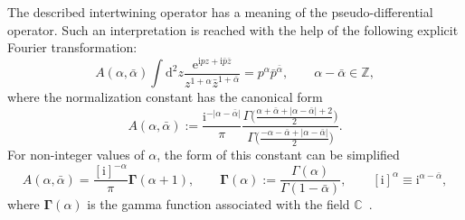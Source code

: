 \documentclass[pdftex]{sigma}
\renewcommand{\imath}{\mathrm{i}}
\numberwithin{equation}{section}
\begin{document}
The described intertwining operator has a meaning of the
pseudo-differential operator. Such an interpretation is reached
with the help of the following explicit Fourier transformation:
\begin{equation}\label{F}
A(\alpha,\bar\alpha) \int \mathrm{d}^2 z \frac{\mathrm{e}^{\imath pz+\imath\bar{p}\bar{z}}}
{z^{1+\alpha}\bar{z}^{1+\bar\alpha}} =
p^{\alpha}\bar{p}^{\bar\alpha} ,\qquad \alpha-\bar\alpha\in \mathbb{Z},
\end{equation}
where the normalization constant has the canonical form~\cite{GGV}
\begin{equation*}
A(\alpha,\bar\alpha):= \frac{\imath^{-|\alpha-\bar\alpha|}}{\pi}
 \frac{\Gamma\bigl(\frac{\alpha+\bar\alpha+|\alpha-\bar\alpha|+2}{2}\bigr)}
{\Gamma\bigl(\frac{-\alpha-\bar\alpha+|\alpha-\bar\alpha|}{2}\bigr)}.
\end{equation*}
For non-integer values of $\alpha$,
the form of this constant can be simplified
\begin{equation*}
A(\alpha,\bar\alpha) =
\frac{[\imath]^{-\alpha}}{\pi} \bm{\Gamma}(\alpha+1), \qquad
\bm{\Gamma}(\alpha):=\frac{\Gamma(\alpha)}{\Gamma(1-\bar\alpha)}, \qquad
[\imath]^{\alpha} \equiv \imath^{\alpha-\bar{\alpha}},
\end{equation*}
where $\bm{\Gamma}(\alpha)$ is the gamma function
associated with the field $\mathbb{C}$~\cite{GGR,N}.
\end{document}
